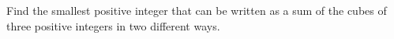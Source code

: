 Find the smallest positive integer that can be written as a sum of the cubes of three positive integers in two different ways.
